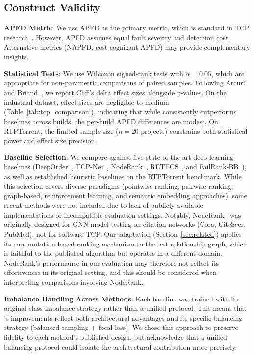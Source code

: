 \subsection{Construct Validity}

\textbf{APFD Metric}: We use APFD as the primary metric, which is standard
in TCP research~\cite{rothermel1999test}. However, APFD assumes equal fault
severity and detection cost. Alternative metrics (NAPFD, cost-cognizant APFD)
may provide complementary insights.

\textbf{Statistical Tests}: We use Wilcoxon signed-rank tests with
$\alpha = 0.05$, which are appropriate for non-parametric comparisons of
paired samples. Following Arcuri and Briand~\cite{arcuri2011practical}, we
report Cliff's delta effect sizes alongside p-values. On the industrial
dataset, effect sizes are negligible to medium (Table~\ref{tab:tcp_comparison}),
indicating that while \filopriori{} consistently outperforms baselines
across builds, the per-build APFD differences are modest. On RTPTorrent,
the limited sample size ($n = 20$ projects) constrains both statistical
power and effect size precision.

\textbf{Baseline Selection}: We compare against five state-of-the-art deep
learning baselines (DeepOrder~\cite{chen2023deeporder},
TCP-Net~\cite{abdelkarim2022tcp}, NodeRank~\cite{li2024noderank},
RETECS~\cite{spieker2017reinforcement}, and
FailRank-BB~\cite{hernandes2025method}), as well as established heuristic
baselines on the RTPTorrent benchmark. While this selection covers diverse
paradigms (pointwise ranking, pairwise ranking, graph-based, reinforcement
learning, and semantic embedding approaches), some recent methods were not
included due to lack of publicly available implementations or incompatible
evaluation settings. Notably, NodeRank~\cite{li2024noderank} was originally
designed for GNN model testing on citation networks (Cora, CiteSeer, PubMed),
not for software TCP. Our adaptation (Section~\ref{sec:related}) applies its
core mutation-based ranking mechanism to the test relationship graph, which is
faithful to the published algorithm but operates in a different domain.
NodeRank's performance in our evaluation may therefore not reflect its
effectiveness in its original setting, and this should be considered when
interpreting comparisons involving NodeRank.

\textbf{Imbalance Handling Across Methods}: Each baseline was trained with its
original class-imbalance strategy rather than a unified protocol. This means
that \filopriori{}'s improvements reflect both architectural advantages and
its specific balancing strategy (balanced sampling + focal loss). We chose
this approach to preserve fidelity to each method's published design, but
acknowledge that a unified balancing protocol could isolate the architectural
contribution more precisely.

